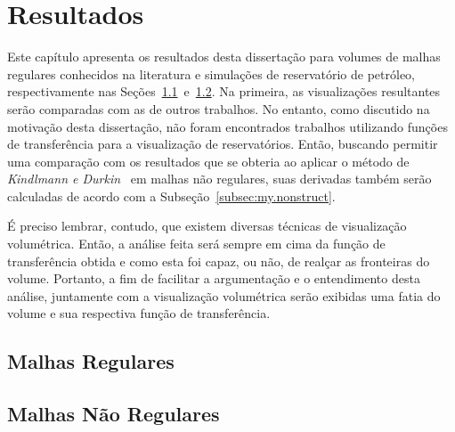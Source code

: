 
\chapter{Resultados}
\label{ch:result}

	Este capítulo apresenta os resultados desta dissertação para volumes de malhas regulares conhecidos na literatura e simulações de reservatório de petróleo, respectivamente nas Seções~\ref{sec:result.reg}~e~\ref{sec:result.irreg}. Na primeira, as visualizações resultantes serão comparadas com as de outros trabalhos. No entanto, como discutido na motivação desta dissertação, não foram encontrados trabalhos utilizando funções de transferência para a visualização de reservatórios. Então, buscando permitir uma comparação com os resultados que se obteria ao aplicar o método de \textit{Kindlmann e Durkin}~\cite{gordon} em malhas não regulares, suas derivadas também serão calculadas de acordo com a Subseção~\ref{subsec:my.nonstruct}.
	
	É preciso lembrar, contudo, que existem diversas técnicas de visualização volumétrica. Então, a análise feita será sempre em cima da função de transferência obtida e como esta foi capaz, ou não, de realçar as fronteiras do volume. Portanto, a fim de facilitar a argumentação e o entendimento desta análise, juntamente com a visualização volumétrica serão exibidas uma fatia do volume e sua respectiva função de transferência.
	
\section{Malhas Regulares}
\label{sec:result.reg}

\section{Malhas Não Regulares}
\label{sec:result.irreg}